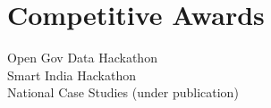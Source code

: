 \documentclass[]{deedy-resume-reversed}
\begin{document}
\begin{minipage}[t]{0.33\textwidth}


\section{Competitive Awards}
Open Gov Data Hackathon\\
Smart India Hackathon\\
National Case Studies (under publication)\\

\sectionsep



\end{minipage}
\end{document}

